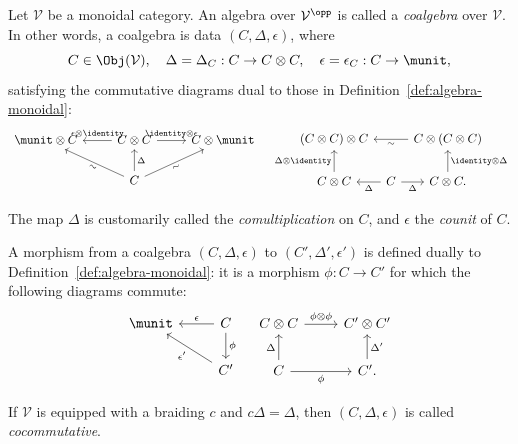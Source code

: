 \begin{definition}[Coalgebra]\label{def:cogebra-monoidal}
	Let $\mathcal{V}$ be a monoidal category. An algebra over
	$\mathcal{V}^{\opp}$ is called a \emph{coalgebra} over $\mathcal{V}$. In
	other words, a coalgebra is data $(C,\Delta,\epsilon)$, where
	\[ C \in \Obj(\mathcal{V}), \quad \Delta = \Delta_C: C \to C \otimes C, \quad \epsilon = \epsilon_C: C \to \munit, \]
	satisfying the commutative diagrams dual to those in
	Definition~\ref{def:algebra-monoidal}:
	\[\begin{tikzcd}
			\munit \otimes C & C \otimes C \arrow[r, "{\identity \otimes \epsilon}"] \arrow[l, "{\epsilon \otimes \identity}"'] & C \otimes \munit \\
			& C \arrow[lu, "\sim"' sloped] \arrow[ru, "\sim"' sloped] \arrow[u, "\Delta"'] &
		\end{tikzcd} \quad
	\begin{tikzcd}[column sep=tiny]
		(C \otimes C) \otimes C & & C \otimes (C \otimes C) \arrow[ll, "\sim"] \\
		C \otimes C \arrow[u, "{\Delta \otimes \identity}"] & C \arrow[l, "\Delta"] \arrow[r, "\Delta"'] & C \otimes C . \arrow[u, "{\identity \otimes \Delta}"']
	\end{tikzcd}\]

	The map $\Delta$ is customarily called the \emph{comultiplication} on $C$,
	and $\epsilon$ the \emph{counit} of $C$.

	A morphism from a coalgebra $(C,\Delta,\epsilon)$ to
	$(C',\Delta',\epsilon')$ is defined dually to
	Definition~\ref{def:algebra-monoidal}: it is a morphism $\phi:C\to C'$ for
	which the following diagrams commute:
	\[\begin{tikzcd}
		\munit & C \arrow[d, "\phi"] \arrow[l, "\epsilon"']  \\
		& C' \arrow[lu, "{\epsilon'}"]
	\end{tikzcd} \quad \begin{tikzcd}
		C \otimes C \arrow[r, "{\phi \otimes \phi}"] & C' \otimes C' \\
		C \arrow[r, "\phi"'] \arrow[u, "\Delta"] & C' . \arrow[u, "{\Delta'}"']
	\end{tikzcd}\]

	If $\mathcal{V}$ is equipped with a braiding $c$ and $c\Delta=\Delta$,
	then $(C,\Delta,\epsilon)$ is called \emph{cocommutative}.
\end{definition}

